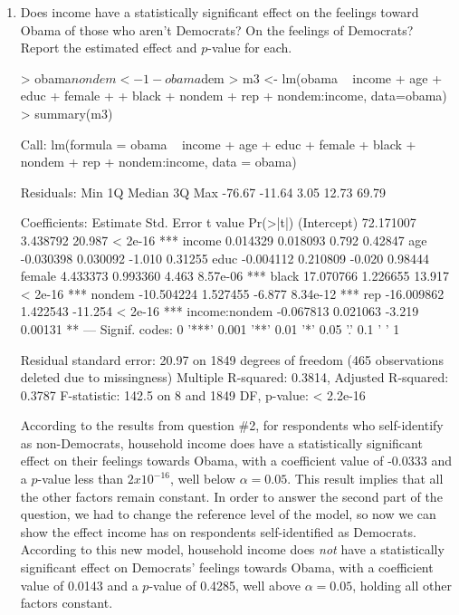 \documentclass[12pt]{article}
\begin{document}
\begin{enumerate}
\item Does income have a statistically significant effect on the feelings toward Obama of those who aren't Democrats?  On the feelings of Democrats?  Report the estimated effect and $p$-value for each.\\

\begin{Schunk}
\begin{Sinput}
> obama$nondem <- 1-obama$dem
> m3 <- lm(obama ~ income + age + educ + female + 
+            black + nondem + rep + nondem:income, data=obama)
> summary(m3)
\end{Sinput}
\begin{Soutput}
Call:
lm(formula = obama ~ income + age + educ + female + black + nondem + 
    rep + nondem:income, data = obama)

Residuals:
   Min     1Q Median     3Q    Max 
-76.67 -11.64   3.05  12.73  69.79 

Coefficients:
                Estimate Std. Error t value Pr(>|t|)    
(Intercept)    72.171007   3.438792  20.987  < 2e-16 ***
income          0.014329   0.018093   0.792  0.42847    
age            -0.030398   0.030092  -1.010  0.31255    
educ           -0.004112   0.210809  -0.020  0.98444    
female          4.433373   0.993360   4.463 8.57e-06 ***
black          17.070766   1.226655  13.917  < 2e-16 ***
nondem        -10.504224   1.527455  -6.877 8.34e-12 ***
rep           -16.009862   1.422543 -11.254  < 2e-16 ***
income:nondem  -0.067813   0.021063  -3.219  0.00131 ** 
---
Signif. codes:  0 '***' 0.001 '**' 0.01 '*' 0.05 '.' 0.1 ' ' 1

Residual standard error: 20.97 on 1849 degrees of freedom
  (465 observations deleted due to missingness)
Multiple R-squared:  0.3814,	Adjusted R-squared:  0.3787 
F-statistic: 142.5 on 8 and 1849 DF,  p-value: < 2.2e-16
\end{Soutput}
\end{Schunk}

According to the results from question \#2, for respondents who self-identify as non-Democrats, household income does have a statistically significant effect on their feelings towards Obama, with a coefficient value of -0.0333 and a $p$-value less than $2x10^{-16}$, well below $\alpha=0.05$. This result implies that all the other factors remain constant. In order to answer the second part of the question, we had to change the reference level of the model, so now we can show the effect income has on respondents self-identified as Democrats. According to this new model, household income does \emph{not} have a statistically significant effect on Democrats' feelings towards Obama, with a coefficient value of 0.0143 and a $p$-value of 0.4285, well above $\alpha=0.05$, holding all other factors constant.


\end{enumerate}
\end{document}
